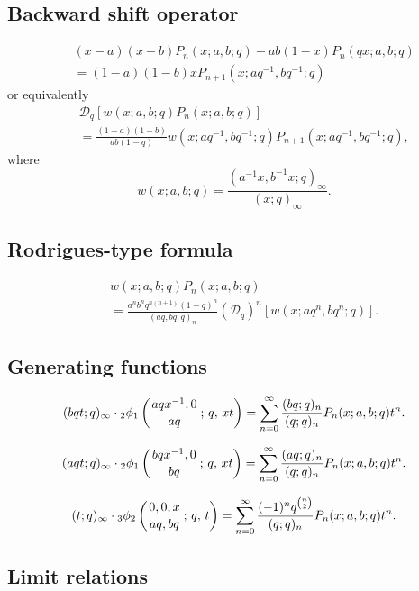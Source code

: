 \documentclass[envcountchap,graybox]{svmono}
\newcommand{\qhyp}[5]{\mbox{}_{#1}{\phi}_{#2}
\left(\genfrac{}{}{0pt}{}{#3}{#4}\,;\,q,\,#5\right)}
\begin{document}
\subsection*{Backward shift operator}
\begin{eqnarray}
\label{shift2BigqLaguerreI}
& &(x-a)(x-b)P_n(x;a,b;q)-ab(1-x)P_n(qx;a,b;q)\nonumber\\
& &{}=(1-a)(1-b)xP_{n+1}(x;aq^{-1},bq^{-1};q)
\end{eqnarray}
or equivalently
\begin{eqnarray}
\label{shift2BigqLaguerreII}
& &\mathcal{D}_q\left[w(x;a,b;q)P_n(x;a,b;q)\right]\nonumber\\
& &{}=\frac{(1-a)(1-b)}{ab(1-q)}w(x;aq^{-1},bq^{-1};q)P_{n+1}(x;aq^{-1},bq^{-1};q),
\end{eqnarray}
where
$$w(x;a,b;q)=\frac{(a^{-1}x,b^{-1}x;q)_{\infty}}{(x;q)_{\infty}}.$$

\subsection*{Rodrigues-type formula}
\begin{eqnarray}
\label{RodBigqLaguerre}
& &w(x;a,b;q)P_n(x;a,b;q)\nonumber\\
& &{}=\frac{a^nb^nq^{n(n+1)}(1-q)^n}
{(aq,bq;q)_n}\left(\mathcal{D}_q\right)^n\left[w(x;aq^n,bq^n;q)\right].
\end{eqnarray}

\subsection*{Generating functions}
\begin{equation}
\label{GenBigqLaguerre1}
(bqt;q)_{\infty}\cdot\qhyp{2}{1}{aqx^{-1},0}{aq}{xt}
=\sum_{n=0}^{\infty}\frac{(bq;q)_n}{(q;q)_n}P_n(x;a,b;q)t^n.
\end{equation}

\begin{equation}
\label{GenBigqLaguerre2}
(aqt;q)_{\infty}\cdot\qhyp{2}{1}{bqx^{-1},0}{bq}{xt}
=\sum_{n=0}^{\infty}\frac{(aq;q)_n}{(q;q)_n}P_n(x;a,b;q)t^n.
\end{equation}

\begin{equation}
\label{GenBigqLaguerre3}
(t;q)_{\infty}\cdot\qhyp{3}{2}{0,0,x}{aq,bq}{t}=\sum_{n=0}^{\infty}
\frac{(-1)^nq^{\binom{n}{2}}}{(q;q)_n}P_n(x;a,b;q)t^n.
\end{equation}

\subsection*{Limit relations}
\end{document}
